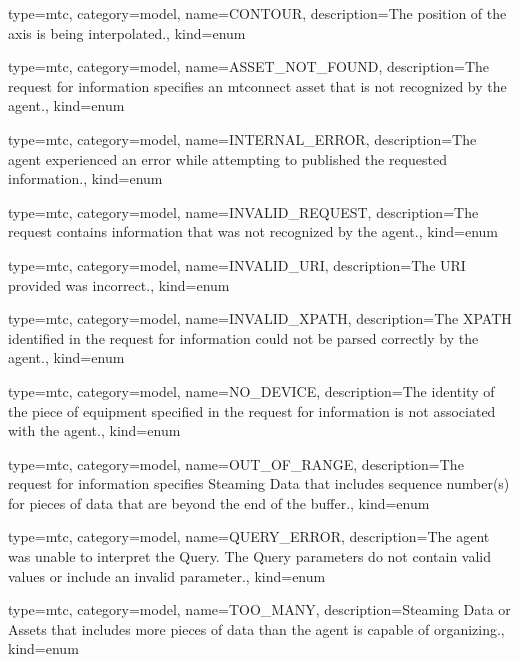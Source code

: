{
  type=mtc,
  category=model,
  name={CONTOUR},
  description={The position of the axis is being interpolated.},
  kind={enum}
}


{
  type=mtc,
  category=model,
  name={ASSET\_NOT\_FOUND},
  description={The \gls{request} for information specifies an \gls{mtconnect asset} that is not recognized by the \gls{agent}.},
  kind={enum}
}

{
  type=mtc,
  category=model,
  name={INTERNAL\_ERROR},
  description={The \gls{agent} experienced an error while attempting to published the requested information.},
  kind={enum}
}


{
  type=mtc,
  category=model,
  name={INVALID\_REQUEST},
  description={The \gls{request} contains information that was not recognized by the \gls{agent}.},
  kind={enum}
}


{
  type=mtc,
  category=model,
  name={INVALID\_URI},
  description={The URI provided was incorrect.},
  kind={enum}
}

{
  type=mtc,
  category=model,
  name={INVALID\_XPATH},
  description={The XPATH identified in the \gls{request} for information could not be parsed correctly by the \gls{agent}.},
  kind={enum}
}

{
  type=mtc,
  category=model,
  name={NO\_DEVICE},
  description={The identity of the piece of equipment specified in the \gls{request} for information is not associated with the \gls{agent}.},
  kind={enum}
}

{
  type=mtc,
  category=model,
  name={OUT\_OF\_RANGE},
  description={The \gls{request} for information specifies Steaming Data that includes sequence number(s) for pieces of data that are beyond the end of the buffer.},
  kind={enum}
}


{
  type=mtc,
  category=model,
  name={QUERY\_ERROR},
  description={The \gls{agent} was unable to interpret the Query.  The Query parameters do not contain valid values or include an invalid parameter.},
  kind={enum}
}

{
  type=mtc,
  category=model,
  name={TOO\_MANY},
  description={Steaming Data or Assets that includes more pieces of data than the \gls{agent} is capable of organizing.},
  kind={enum}
}

